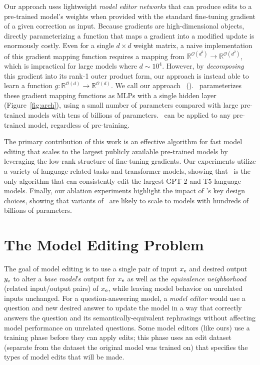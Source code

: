 \documentclass{article}
\begin{document}
Our approach uses lightweight \textit{model editor networks} that can produce edits to a pre-trained model's weights when provided with the standard fine-tuning gradient of a given correction as input. Because gradients are high-dimensional objects, directly parameterizing a function that maps a gradient into a modified update is enormously costly. Even for a single $d \times d$ weight matrix, a naive implementation of this gradient mapping function requires a mapping from $\mathbb{R}^{\mathcal{O}(d^2)} \rightarrow \mathbb{R}^{\mathcal{O}(d^2)}$, which is impractical for large models where $d\sim10^4$. However, by \textit{decomposing} this gradient into its rank-1 outer product form, our approach is instead able to learn a function $g:\mathbb{R}^{\mathcal{O}(d)} \rightarrow \mathbb{R}^{\mathcal{O}(d)}$. We call our approach \fullname~(\name). \name~parameterizes these gradient mapping functions as MLPs with a single hidden layer (Figure~\ref{fig:arch}), using a small number of parameters compared with large pre-trained models with tens of billions of parameters. \name~can be applied to any pre-trained model, regardless of pre-training.

The primary contribution of this work is an effective algorithm for fast model editing that scales to the largest publicly available pre-trained models by leveraging the low-rank structure of fine-tuning gradients. Our experiments utilize a variety of language-related tasks and transformer models, showing that \name~is the only algorithm that can consistently edit the largest GPT-2 \citep{radford2019language} and T5 \citep{2020t5} language models. Finally, our ablation experiments highlight the impact of \name's key design choices, showing that variants of \name~are likely to scale to models with hundreds of billions of parameters.


\section{The Model Editing Problem}
The goal of model editing is to use a single pair of input $x_\text{e}$ and desired output $y_\text{e}$ to alter a \textit{base model}'s output for $x_\text{e}$ as well as the \textit{equivalence neighborhood} (related input/output pairs) of $x_\text{e}$, while leaving model behavior on unrelated inputs unchanged. For a question-answering model, a \textit{model editor} would use a question and new desired answer to update the model in a way that correctly answers the question and its semantically-equivalent rephrasings without affecting model performance on unrelated questions. Some model editors (like ours) use a training phase before they can apply edits; this phase uses an edit dataset (separate from the dataset the original model was trained on) that specifies the types of model edits that will be made.
\end{document}
